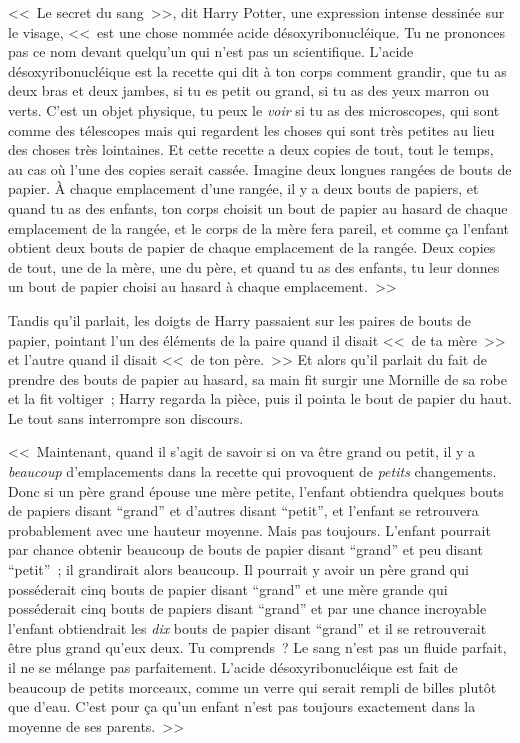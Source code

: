 <<~Le secret du sang~>>, dit Harry Potter, une expression intense dessinée sur le visage, <<~est une chose nommée acide désoxyribonucléique. Tu ne prononces pas ce nom devant quelqu'un qui n'est pas un scientifique. L'acide désoxyribonucléique est la recette qui dit à ton corps comment grandir, que tu as deux bras et deux jambes, si tu es petit ou grand, si tu as des yeux marron ou verts. C'est un objet physique, tu peux le \emph{voir} si tu as des microscopes, qui sont comme des télescopes mais qui regardent les choses qui sont très petites au lieu des choses très lointaines. Et cette recette a deux copies de tout, tout le temps, au cas où l'une des copies serait cassée. Imagine deux longues rangées de bouts de papier. À chaque emplacement d'une rangée, il y a deux bouts de papiers, et quand tu as des enfants, ton corps choisit un bout de papier au hasard de chaque emplacement de la rangée, et le corps de la mère fera pareil, et comme ça l'enfant obtient deux bouts de papier de chaque emplacement de la rangée. Deux copies de tout, une de la mère, une du père, et quand tu as des enfants, tu leur donnes un bout de papier choisi au hasard à chaque emplacement.~>>

Tandis qu'il parlait, les doigts de Harry passaient sur les paires de bouts de papier, pointant l'un des éléments de la paire quand il disait <<~de ta mère~>> et l'autre quand il disait <<~de ton père.~>> Et alors qu'il parlait du fait de prendre des bouts de papier au hasard, sa main fit surgir une Mornille de sa robe et la fit voltiger~; Harry regarda la pièce, puis il pointa le bout de papier du haut. Le tout sans interrompre son discours.

<<~Maintenant, quand il s'agit de savoir si on va être grand ou petit, il y a \emph{beaucoup} d'emplacements dans la recette qui provoquent de \emph{petits} changements. Donc si un père grand épouse une mère petite, l'enfant obtiendra quelques bouts de papiers disant “grand” et d'autres disant “petit”, et l'enfant se retrouvera probablement avec une hauteur moyenne. Mais pas toujours. L'enfant pourrait par chance obtenir beaucoup de bouts de papier disant “grand” et peu disant “petit”~; il grandirait alors beaucoup. Il pourrait y avoir un père grand qui posséderait cinq bouts de papier disant “grand” et une mère grande qui posséderait cinq bouts de papiers disant “grand” et par une chance incroyable l'enfant obtiendrait les \emph{dix} bouts de papier disant “grand” et il se retrouverait être plus grand qu'eux deux. Tu comprends~? Le sang n'est pas un fluide parfait, il ne se mélange pas parfaitement. L'acide désoxyribonucléique est fait de beaucoup de petits morceaux, comme un verre qui serait rempli de billes plutôt que d'eau. C'est pour ça qu'un enfant n'est pas toujours exactement dans la moyenne de ses parents.~>>

